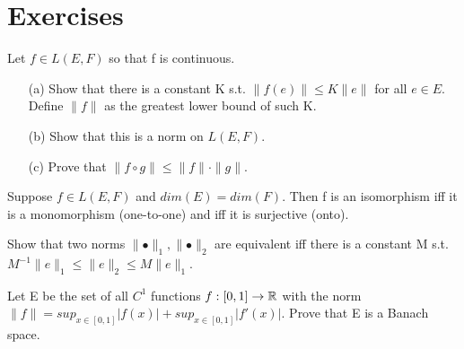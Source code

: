\section*{Exercises}
\begin{exer}
Let $f\in L(E,F)$ so that f is continuous.
\begin{enumerate}
\item[(a)] Show that there is a constant K s.t. $\parallel f(e)\parallel\leq K\parallel e\parallel$ for all $e\in E$.
Define $\parallel f\parallel$ as the greatest lower bound of such K.
\item[(b)] Show that this is a norm on $L(E,F)$.
\item[(c)] Prove that $\parallel f\circ g\parallel\leq \parallel f\parallel \cdot \parallel g\parallel$.
\end{enumerate}
\end{exer}
\begin{exer}
Suppose $f\in L(E,F)$ and $dim(E)=dim(F)$. Then f is an isomorphism iff it is a monomorphism (one-to-one) and iff it is
surjective (onto).
\end{exer}
\begin{exer}
Show that two norms $\parallel\bullet\parallel_1,\parallel\bullet\parallel_2$ are equivalent iff there is a constant M
s.t. $M^{-1}\parallel e\parallel_1\leq \parallel e\parallel_2\leq M \parallel e\parallel_1$.
\end{exer}
\begin{exer}
Let E be the set of all $C^1$ functions ${f}:{[0,1]}\rightarrow{\mathbb{R}}$ with the norm $\parallel f\parallel=sup_{x\in
[0,1]}|f(x)|+ sup_{x\in [0,1]}|f'(x)|$. Prove that E is a Banach space.
\end{exer}
